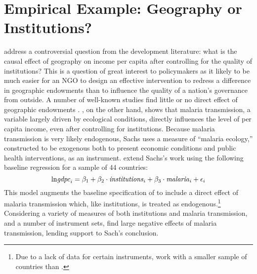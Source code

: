 \section{Empirical Example: Geography or Institutions?}
\label{sec:application}
\cite{Carstensen2006} address a controversial question from the development literature: what is the causal effect of geography on income per capita after controlling for the quality of institutions?
This is a question of great interest to policymakers as it likely to be much easier for an NGO to design an effective intervention to redress a difference in geographic endowments than to influence the quality of a nation's governance from outside.
A number of well-known studies find little or no direct effect of geographic endowments \citep{Acemoglu,Rodrik,Easterly}. \cite{Sachs}, on the other hand, shows that malaria transmission, a variable largely driven by ecological conditions, directly influences the level of per capita income, even after controlling for institutions.
Because malaria transmission is very likely endogenous, Sachs uses a measure of ``malaria ecology,'' constructed to be exogenous both to present economic conditions and public health interventions, as an instrument. 
\cite{Carstensen2006} extend Sachs's work using the following baseline regression for a sample of 44 countries:
\begin{equation}
	\mbox{ln\emph{gdpc}}_i = \beta_1 + \beta_2 \cdot \mbox{\emph{institutions}}_i + \beta_3 \cdot \mbox{\emph{malaria}}_i + \epsilon_i
\end{equation}
This model augments the baseline specification of \cite{Acemoglu} to include a direct effect of malaria transmission which, like institutions, is treated as endogenous.\footnote{Due to a lack of data for certain instruments, \cite{Carstensen2006} work with a smaller sample of countries than \cite{Acemoglu}.} 
Considering a variety of measures of both institutions and malaria transmission, and a number of instrument sets, \cite{Carstensen2006} find large negative effects of malaria transmission, lending support to Sach's conclusion.

